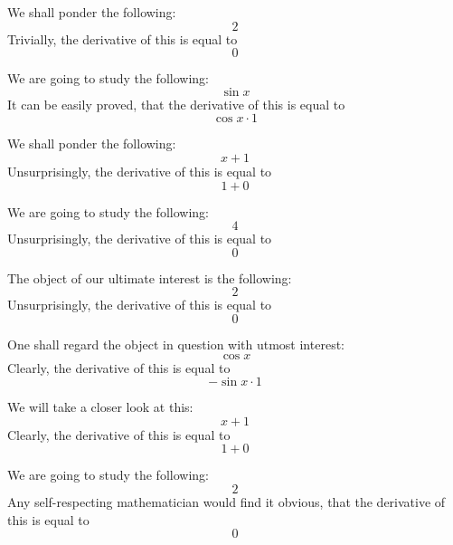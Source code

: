 \documentclass{article}
\begin{document}
We shall ponder the following:
\begin{equation}
2 
\end{equation}
Trivially, the derivative of this is equal to
\begin{equation}
0 
\end{equation}

We are going to study the following:
\begin{equation}
\sin x 
\end{equation}
It can be easily proved, that the derivative of this is equal to
\begin{equation}
\cos x \cdot 1 
\end{equation}

We shall ponder the following:
\begin{equation}
x + 1 
\end{equation}
Unsurprisingly, the derivative of this is equal to
\begin{equation}
1 + 0 
\end{equation}

We are going to study the following:
\begin{equation}
4 
\end{equation}
Unsurprisingly, the derivative of this is equal to
\begin{equation}
0 
\end{equation}

The object of our ultimate interest is the following:
\begin{equation}
2 
\end{equation}
Unsurprisingly, the derivative of this is equal to
\begin{equation}
0 
\end{equation}

One shall regard the object in question with utmost interest:
\begin{equation}
\cos x 
\end{equation}
Clearly, the derivative of this is equal to
\begin{equation}
-\sin x \cdot 1 
\end{equation}

We will take a closer look at this:
\begin{equation}
x + 1 
\end{equation}
Clearly, the derivative of this is equal to
\begin{equation}
1 + 0 
\end{equation}

We are going to study the following:
\begin{equation}
2 
\end{equation}
Any self-respecting mathematician would find it obvious, that the derivative of this is equal to
\begin{equation}
0 
\end{equation}
\end{document}
